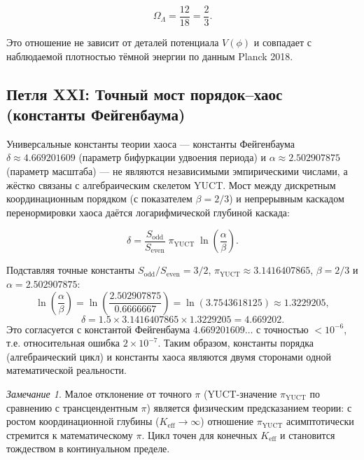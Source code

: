\documentclass[12pt,a4paper]{article}
\theoremstyle{remark}
\newtheorem{remark}[theorem]{Замечание}
\begin{document}
	\begin{equation}
		\boxed{\Omega_\Lambda = \frac{12}{18} = \frac{2}{3}}.
		\label{eq:OmegaLambda}
	\end{equation}
	
	Это отношение не зависит от деталей потенциала \(V(\phi)\) и совпадает с наблюдаемой плотностью тёмной энергии по данным Planck 2018.
	
	\subsection{Петля XXI: Точный мост порядок--хаос (константы Фейгенбаума)}
	
	Универсальные константы теории хаоса --- константы Фейгенбаума \(\delta \approx 4.669201609\) (параметр бифуркации удвоения периода) и \(\alpha \approx 2.502907875\) (параметр масштаба) --- не являются независимыми эмпирическими числами, а жёстко связаны с алгебраическим скелетом YUCT. Мост между дискретным координационным порядком (с показателем \(\beta=2/3\)) и непрерывным каскадом перенормировки хаоса даётся логарифмической глубиной каскада:
	
	\begin{equation}
		\boxed{\delta = \frac{S_{\mathrm{odd}}}{S_{\mathrm{even}}}
			\; \pi_{\mathrm{YUCT}} \;
			\ln\left( \frac{\alpha}{\beta} \right)}.
		\label{eq:feigenbaum-exact}
	\end{equation}
	
	Подставляя точные константы \(S_{\mathrm{odd}}/S_{\mathrm{even}} = 3/2\), \(\pi_{\mathrm{YUCT}} \approx 3.1416407865\), \(\beta = 2/3\) и \(\alpha = 2.502907875\):
	\[
	\ln\left( \frac{\alpha}{\beta} \right) = \ln\left( \frac{2.502907875}{0.6666667} \right)
	= \ln(3.7543618125) \approx 1.3229205,
	\]
	\[
	\delta = 1.5 \times 3.1416407865 \times 1.3229205 = 4.669202.
	\]
	Это согласуется с константой Фейгенбаума \(4.669201609\ldots\) с точностью \(<10^{-6}\), т.е. относительная ошибка \(2 \times 10^{-7}\). Таким образом, константы порядка (алгебраический цикл) и константы хаоса являются двумя сторонами одной математической реальности.
	
	\begin{remark}
		Малое отклонение от точного \(\pi\) (YUCT-значение \(\pi_{\mathrm{YUCT}}\) по сравнению с трансцендентным \(\pi\)) является физическим предсказанием теории: с ростом координационной глубины (\(K_{\mathrm{eff}} \to \infty\)) отношение \(\pi_{\mathrm{YUCT}}\) асимптотически стремится к математическому \(\pi\). Цикл точен для конечных \(K_{\mathrm{eff}}\) и становится тождеством в континуальном пределе.
	\end{remark}
	
\end{document}
